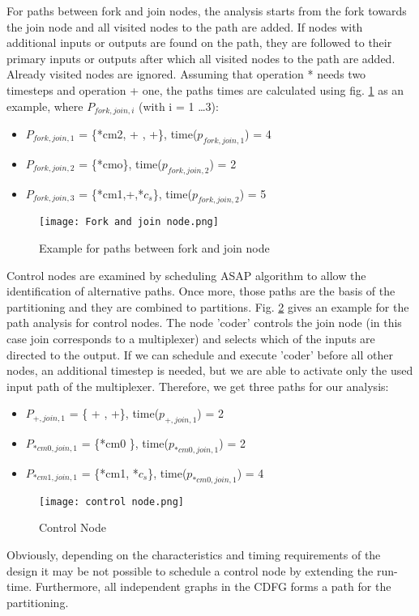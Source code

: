 \documentclass[conference]{IEEEtran}
\begin{document}
For paths between fork and join nodes, the analysis starts from the fork towards the join node and all visited nodes to the path are added. If nodes with additional inputs or outputs are found on the path, they are followed to their primary inputs or outputs after which all visited nodes to the path are added. Already visited nodes are ignored. Assuming that operation * needs two timesteps and operation + one, the paths times are calculated using fig. \ref{fig:fork and join} as an example, where $P_{fork,join,i}$ (with i = 1 \ldots 3): 
\begin{itemize}
    \item $P_{fork,join,1}$ = \{*cm2, + , +\}, time($p_{fork,join,1}$) = 4
    \item $P_{fork,join,2}$ = \{*cmo\}, time($p_{fork,join,2}$) = 2 
    \item $P_{fork,join,3}$ = \{*cm1,+,*$c_s$\}, time($p_{fork,join,2}$) = 5
\end{itemize}

\begin{figure}[h!]
    \centering
    \texttt{[image: Fork and join node.png]}
    \caption{Example for paths between fork and join node}
    \label{fig:fork and join}
\end{figure}

Control nodes are examined by scheduling ASAP algorithm to allow the identification of alternative paths. Once more, those paths are the basis of the partitioning and they are combined to partitions. Fig. \ref{fig:control node} gives an example for the path analysis for control nodes. The node 'coder' controls the join node (in this case join corresponds to a multiplexer) and selects which of the inputs are directed to the output. If we can schedule and execute 'coder' before all other nodes, an additional timestep is needed, but we are able to activate only the used input path of the multiplexer. Therefore, we get three paths for our analysis:  

\begin{itemize}
    \item $P_{+,join,1}$ = \{ + , +\}, time($p_{+,join,1}$) = 2
    \item $P_{*cm0,join,1}$ = \{*cm0 \}, time($p_{*cm0,join,1}$) = 2
    \item $P_{*cm1,join,1}$ = \{*cm1, *$c_s$\}, time($p_{*cm0,join,1}$) = 4
\end{itemize}

\begin{figure}[h!]
    \centering
    \texttt{[image: control node.png]}
    \caption{Control Node}
    \label{fig:control node}
\end{figure}
Obviously, depending on the characteristics and timing requirements of the design it may be not possible to schedule a control node by extending the run-time. Furthermore, all independent graphs in the CDFG forms a path for the partitioning.
\end{document}

